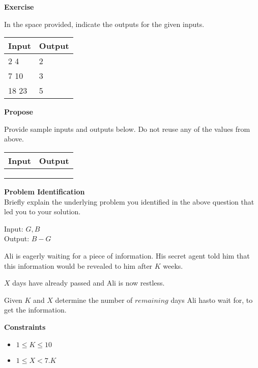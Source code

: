 \documentclass[a4paper]{exam}
\newcommand\heading[1]{\textbf{#1}}
\begin{document}
\begin{questions}
    \heading{Exercise}

    In the space provided, indicate the outputs for the given inputs.

    \begin{tabularx}{\textwidth}{|X|X|}
        \rowcolor{gray!50}
        \hline
        Input & Output \\ \hline\hline
        2 4   & 2      \\\hline
        7 10  & 3      \\\hline
        18 23 & 5      \\\hline
    \end{tabularx}

    \heading{Propose}

    Provide sample inputs and outputs below. Do not reuse any of the values from above.

    \begin{tabularx}{\textwidth}{|X|X|}
        \rowcolor{gray!50}
        \hline
        Input & Output \\ \hline\hline
              &        \\\hline
              &        \\\hline
              &        \\\hline
    \end{tabularx}

    \heading{Problem Identification}\\
    Briefly explain the underlying problem you identified in the above question that led you to your solution.

    \begin{mdframed}
      Input: $G,B$\\
      Output: $B-G$
    \end{mdframed}




    Ali is eagerly waiting for a piece of information. His secret agent told him that this information would be revealed to him after $K$ weeks.

    $X$ days have already passed and Ali is now restless.


    Given $K$ and $X$ determine the number of $remaining$ days Ali hasto wait for, to get the information.

    \heading{Constraints}
    \begin{itemize}
        \item $1 \le K \le 10$
        \item $1 \le X < 7.K$
    \end{itemize}



\end{questions}
\end{document}
